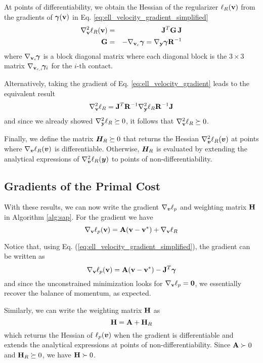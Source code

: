 At points of differentiability, we obtain the Hessian of the regularizer
$\ell_R({\mathbf{v}})$ from the gradients of ${\bm\gamma}({\mathbf{v}})$ in Eq.
\eqref{eq:ell_velocity_gradient_simplified}
\begin{eqnarray}
	\nabla_\mf{v}^2\ell_R(\mf{v}) &=& \mf{J}^T\mf{G}\,\mf{J}\nonumber\\
	\mf{G} &=&-\nabla_{\mf{v}_c}\bgamma = \nabla_\mf{y}\bgamma \mf{R}^{-1}
	\label{eq:ellR_hessian}
\end{eqnarray}
where $\nabla_{{\mathbf{v}}_c}\!{\bm\gamma}$ is a block diagonal matrix where each
diagonal block is the $3\times 3$ matrix $\nabla_{{\mathbf{v}}_{c,i}}\!{\bm\gamma}_i$
for the $i\text{-th}$ contact.

Alternatively, taking the gradient of Eq. \eqref{eq:ell_velocity_gradient} leads to the equivalent result
\begin{equation}
	\nabla_\mf{v}^2\ell_R = \mf{J}^T\mf{R}^{-1}\nabla_\mf{y}^2\ell_R\mf{R}^{-1}\mf{J}
	\label{eq:ell_velocity_hessian}
\end{equation}
and since we already showed $\nabla_{\mathbf{y}}^2\ell_R\succeq 0$, it follows that
$\nabla_{\mathbf{v}}^2\ell_R\succeq 0$.

Finally, we define the matrix ${\bm{H}}_R \succeq 0$ that returns the Hessian
$\nabla_{\bm{v}}^2\ell_R({\bm{v}})$ at points where $\nabla_{\bm{v}}\ell_R({\bm{v}})$ is
differentiable. Otherwise, ${\bm{H}}_R$ is evaluated by extending the analytical
expressions of $\nabla_{\bm{v}}^2\ell_R({\bm{y}})$ to points of
non-differentiability.

\subsection{Gradients of the Primal Cost}
With these results, we can now write the gradient $\nabla_{\bm{v}}\ell_p$ and weighting matrix ${\mathbf{H}}$ in Algorithm \ref{alg:sap}. For the gradient we
have
\begin{equation}
	\nabla_{\mathbf{v}}\ell_p({\mathbf{v}}) = {\mathbf{A}}({\mathbf{v}}-{\mathbf{v}}^*) + \nabla_{\mathbf{v}}\ell_R
\end{equation}

Notice that, using Eq. (\ref{eq:ell_velocity_gradient_simplified}), the gradient
can be written as
\begin{equation}
	\nabla_{\mathbf{v}}\ell_p({\mathbf{v}}) = {\mathbf{A}}({\mathbf{v}}-{\mathbf{v}}^*) - {\mathbf{J}}^T{\bm\gamma}
\end{equation}
and since the unconstrained minimization looks for $\nabla_{\mathbf{v}}\ell_p={\mathbf{0}}$,
we essentially recover the balance of momentum, as expected.

Similarly, we can write the weighting matrix ${\mathbf{H}}$ as
\begin{equation}
	{\mathbf{H}} = {\mathbf{A}} + {\mathbf{H}}_R
\end{equation}
which returns the Hessian of $\ell_p({\bm{v}})$ when the gradient is
differentiable and extends the analytical expressions at points of
non-differentiability. Since ${\mathbf{A}}\succ 0$ and ${\mathbf{H}}_R \succeq 0$, we have
${\mathbf{H}}\succ 0$.
